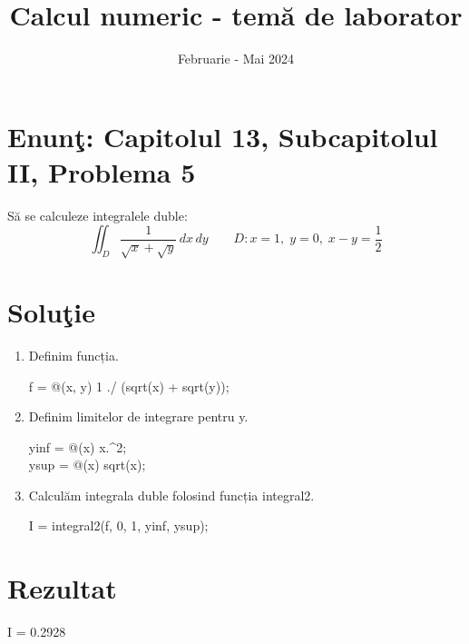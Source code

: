 \documentclass{article}
\begin{document}
\title{Calcul numeric - tem\u{a} de laborator}

\author{}

\date{Februarie - Mai 2024}

\maketitle              %








\section*{Enun\c{t}: Capitolul 13, Subcapitolul II, Problema 5}

S\u{a} se calculeze integralele duble:
\[
\iint_{D} \frac{1}{\sqrt{x} + \sqrt{y}} \, dx \, dy \quad  \quad D : x = 1, \; y = 0, \; x - y = \frac{1}{2}
\]

\section*{Solu\c{t}ie}

\begin{center}
\begin{enumerate}
\item  Definim funcția. \\
\begin{center}
f = @(x, y) 1 ./ (sqrt(x) + sqrt(y));
\end{center}
\item Definim limitelor de integrare pentru y. \\
 \begin{center}
    yinf = @(x) x.\^{}2;\\
ysup = @(x) sqrt(x);
 \end{center}
\item Calculăm integrala duble folosind funcția integral2.\\
 \begin{center}
     I = integral2(f, 0, 1, yinf, ysup);
 \end{center}
\end{enumerate}
\end{center}

\section*{Rezultat}
\begin{center}
I = 0.2928
\end{center}
\end{document}

